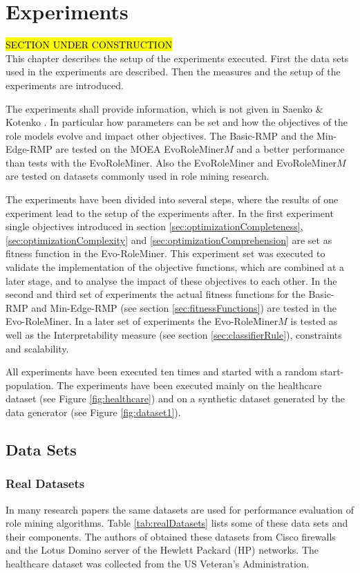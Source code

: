 \newpage
\chapter{Experiments}
\label{sec:experiments}
\hl{SECTION UNDER CONSTRUCTION}\\
This chapter describes the setup of the experiments executed. First the data sets used in the experiments are described. Then the measures and the setup of the experiments are introduced.

The experiments shall provide information, which is not given in Saenko \& Kotenko \cite{saenko2012design}. In particular how parameters can be set and how the objectives of the role models evolve and impact other objectives. The Basic-RMP and the Min-Edge-RMP are tested on the MOEA EvoRoleMiner$M$ and a better performance than tests with the EvoRoleMiner. Also the EvoRoleMiner and EvoRoleMiner$M$ are tested on datasets commonly used in role mining research.

The experiments have been divided into several steps, where the results of one experiment lead to the setup of the experiments after. In the first experiment  single objectives introduced in section \ref{sec:optimizationCompleteness}, \ref{sec:optimizationComplexity} and \ref{sec:optimizationComprehension} are set as fitness function in the Evo-RoleMiner. This experiment set was executed to validate the implementation of the objective functions, which are combined at a later stage, and to analyse the impact of these objectives to each other. In the second and third set of experiments the actual fitness functions for the Basic-RMP and Min-Edge-RMP (see section \ref{sec:fitnessFunctions}) are tested in the Evo-RoleMiner. In a later set of experiments the Evo-RoleMiner$M$ is tested as well as the Interpretability measure (see section \ref{sec:classifierRule}), constraints and scalability.

All experiments have been executed ten times and started with a random start-population. The experiments have been executed mainly on the healthcare dataset (see Figure \ref{fig:healthcare}) and on a synthetic dataset generated by the data generator (see Figure \ref{fig:dataset1}).

\section{Data Sets}
\subsection{Real Datasets}
In many research papers the same datasets are used for performance evaluation of role mining algorithms. Table \ref{tab:realDatasets} lists some of these data sets and their components. The authors of \cite{Ene} obtained these datasets from Cisco firewalls and the Lotus Domino server of the Hewlett Packard (HP) networks. The healthcare dataset was collected from the US Veteran’s Administration.

